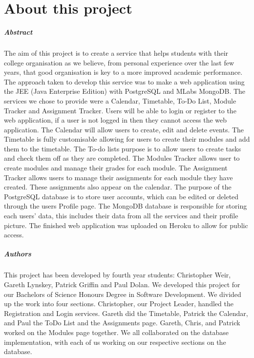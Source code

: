 
\chapter*{About this project}
\paragraph{Abstract}
The aim of this project is to create a service that helps students with their college organisation as we believe, from personal experience over the last few years, that good organisation is key to a more improved academic performance. The approach taken to develop this service was to make a web application using the JEE (Java Enterprise Edition) with PostgreSQL and MLabs MongoDB. The services we chose to provide were a Calendar, Timetable, To-Do List, Module Tracker and Assignment Tracker. Users will be able to login or register to the web application, if a user is not logged in then they cannot access the web application. The Calendar will allow users to create, edit and delete events. The Timetable is fully customisable allowing for users to create their modules and add them to the timetable. The To-do lists purpose is to allow users to create tasks and check them off as they are completed. The Modules Tracker allows user to create modules and manage their grades for each module. The Assignment Tracker allows users to manage their assignments for each module they have created. These assignments also appear on the calendar. The purpose of the PostgreSQL database is to store user accounts, which can be edited or deleted through the users Profile page. The MongoDB database is responsible for storing each users’ data, this includes their data from all the services and their profile picture. The finished web application was uploaded on Heroku to allow for public access.

\paragraph{Authors}
This project has been developed by fourth year students: Christopher Weir, Gareth Lynskey, Patrick Griffin and Paul Dolan. We developed this project for our Bachelors of Science Honours Degree in Software Development. We divided up the work into four sections. Christopher, our Project Leader, handled the Registration and Login services. Gareth did the Timetable, Patrick the Calendar, and Paul the ToDo List and the Assignments page. Gareth, Chris, and Patrick worked on the Modules page together. We all collaborated on the database implementation, with each of us working on our respective sections on the database.

